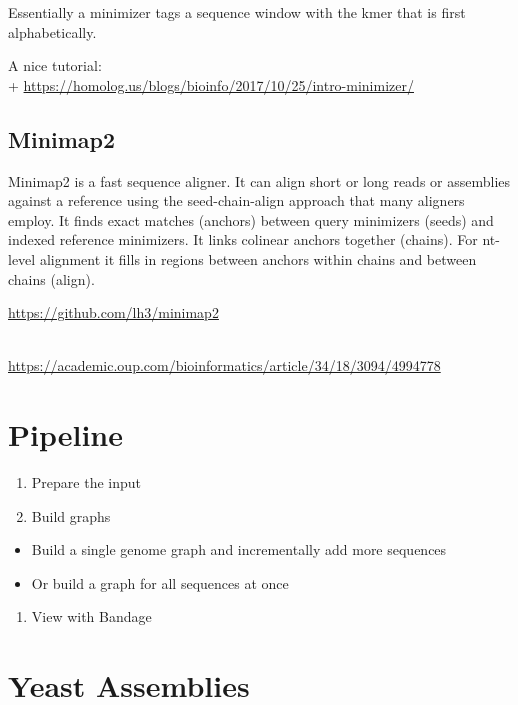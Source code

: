 \documentclass[
]{book}
\providecommand{\tightlist}{%
  \setlength{\itemsep}{0pt}\setlength{\parskip}{0pt}}
\begin{document}
Essentially a minimizer tags a sequence window with the kmer that is first alphabetically.

A nice tutorial:\\
+ \url{https://homolog.us/blogs/bioinfo/2017/10/25/intro-minimizer/}

\hypertarget{minimap2}{%
\subsection*{Minimap2}\label{minimap2}}

Minimap2 is a fast sequence aligner.
It can align short or long reads or assemblies against a reference using the seed-chain-align approach that many aligners employ. It finds exact matches (anchors) between query minimizers (seeds) and indexed reference minimizers. It links colinear anchors together (chains). For nt-level alignment it fills in regions between anchors within chains and between chains (align).

\url{https://github.com/lh3/minimap2}\strut \\
\url{https://academic.oup.com/bioinformatics/article/34/18/3094/4994778}

\hypertarget{pipeline}{%
\section{Pipeline}\label{pipeline}}

\begin{enumerate}
\def\labelenumi{\arabic{enumi}.}
\tightlist
\item
  Prepare the input
\item
  Build graphs
\end{enumerate}

\begin{itemize}
\tightlist
\item
  Build a single genome graph and incrementally add more sequences
\item
  Or build a graph for all sequences at once
\end{itemize}

\begin{enumerate}
\def\labelenumi{\arabic{enumi}.}
\setcounter{enumi}{2}
\tightlist
\item
  View with Bandage
\end{enumerate}

\hypertarget{yeast-assemblies}{%
\section{Yeast Assemblies}\label{yeast-assemblies}}
\end{document}
